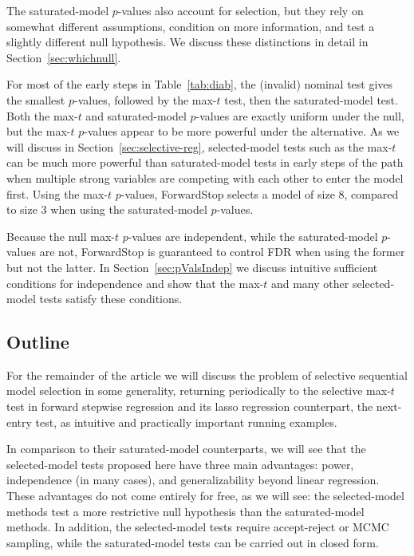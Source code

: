 \documentclass{article}
\begin{document}
The saturated-model $p$-values also account for selection, but they rely on somewhat different assumptions, condition on more information, and test a slightly different null hypothesis. We discuss these distinctions in detail in Section~\ref{sec:whichnull}.

For most of the early steps in Table~\ref{tab:diab}, the (invalid) nominal test gives the smallest $p$-values, followed by the max-$t$ test, then the saturated-model test. Both the max-$t$ and saturated-model $p$-values are exactly uniform under the null, but the max-$t$ $p$-values appear to be more powerful under the alternative. As we will discuss in Section~\ref{sec:selective-reg}, selected-model tests such as the max-$t$ can be much more powerful than saturated-model tests in early steps of the path when multiple strong variables are competing with each other to enter the model first. Using the max-$t$ $p$-values, ForwardStop selects a model of size 8, compared to size 3 when using the saturated-model $p$-values. 

Because the null max-$t$ $p$-values are independent, while the saturated-model $p$-values are not, ForwardStop is guaranteed to control FDR when using the former but not the latter. In Section~\ref{sec:pValsIndep} we discuss intuitive sufficient conditions for independence and show that the max-$t$ and many other selected-model tests satisfy these conditions.


\subsection{Outline}

For the remainder of the article we will discuss the problem of selective sequential model selection in some generality, returning periodically to the selective max-$t$ test in forward stepwise regression and its lasso regression counterpart, the next-entry test, as intuitive and practically important running examples. 

In comparison to their saturated-model counterparts, we will see that the selected-model tests proposed here have three main advantages: power, independence (in many cases), and generalizability beyond linear regression. These advantages do not come entirely for free, as we will see: the selected-model methods test a more restrictive null hypothesis than the saturated-model methods. In addition, the selected-model tests require accept-reject or MCMC sampling, while the saturated-model tests can be carried out in closed form.
\end{document}
